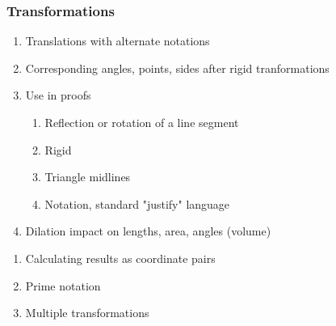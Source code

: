 \documentclass[12pt, oneside]{article}
\begin{document}
\subsubsection*{Transformations}
  \begin{enumerate}
  \item Translations with alternate notations
  \item Corresponding angles, points, sides after rigid tranformations
  \item Use in proofs
  \begin{enumerate}
    \item Reflection or rotation of a line segment
    \item Rigid
    \item Triangle midlines
    \item Notation, standard "justify" language
    \end{enumerate}
  \item Dilation impact on lengths, area, angles (volume)
  \end{enumerate}

  \begin{enumerate}
    \subsubsection*{Translations}
    \item Calculating results as coordinate pairs
    \item Prime notation
    \item Multiple transformations


  \end{enumerate}
\end{document}
